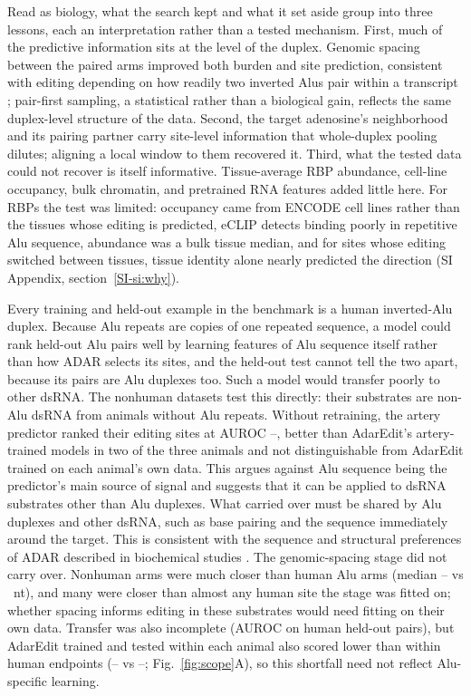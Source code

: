 \documentclass[9pt,twocolumn,twoside]{pnas-new}
\newcommand{\SIref}[1]{\ref*{SI-#1}}
\begin{document}
Read as biology, what the search kept and what it set aside group into three lessons, each an interpretation rather than a tested mechanism. First, much of the predictive information sits at the level of the duplex. Genomic spacing between the paired arms improved both burden and site prediction, consistent with editing depending on how readily two inverted Alus pair within a transcript \cite{Bazak2014Editability}; pair-first sampling, a statistical rather than a biological gain, reflects the same duplex-level structure of the data. Second, the target adenosine's neighborhood and its pairing partner carry site-level information that whole-duplex pooling dilutes; aligning a local window to them recovered it. Third, what the tested data could not recover is itself informative. Tissue-average RBP abundance, cell-line occupancy, bulk chromatin, and pretrained RNA features added little here. For RBPs the test was limited: occupancy came from ENCODE cell lines rather than the tissues whose editing is predicted, eCLIP detects binding poorly in repetitive Alu sequence, abundance was a bulk tissue median, and for sites whose editing switched between tissues, tissue identity alone nearly predicted the direction (SI Appendix, section~\SIref{si:why}).

Every training and held-out example in the benchmark is a human inverted-Alu duplex. Because Alu repeats are copies of one repeated sequence, a model could rank held-out Alu pairs well by learning features of Alu sequence itself rather than how ADAR selects its sites, and the held-out test cannot tell the two apart, because its pairs are Alu duplexes too. Such a model would transfer poorly to other dsRNA. The nonhuman datasets test this directly: their substrates are non-Alu dsRNA from animals without Alu repeats. Without retraining, the artery predictor ranked their editing sites at AUROC \NonhumanArteryAUROCMin{}--\NonhumanArteryAUROCMax{}, better than AdarEdit's artery-trained models in two of the three animals and not distinguishable from AdarEdit trained on each animal's own data. This argues against Alu sequence being the predictor's main source of signal and suggests that it can be applied to dsRNA substrates other than Alu duplexes. What carried over must be shared by Alu duplexes and other dsRNA, such as base pairing and the sequence immediately around the target. This is consistent with the sequence and structural preferences of ADAR described in biochemical studies \cite{Lehmann2000,Eggington2011}. The genomic-spacing stage did not carry over. Nonhuman arms were much closer than human Alu arms (median \NonhumanMedianGapMin{}--\NonhumanMedianGapMax{} vs \NonhumanHumanMedianGap{}~nt), and many were closer than almost any human site the stage was fitted on; whether spacing informs editing in these substrates would need fitting on their own data. Transfer was also incomplete (AUROC \LockedArteryAUROC{} on human held-out pairs), but AdarEdit trained and tested within each animal also scored lower than within human endpoints (\ReferenceNonhumanWithinAUROCMin{}--\ReferenceNonhumanWithinAUROCMax{} vs \ReferenceHumanWithinAUROCMin{}--\ReferenceHumanWithinAUROCMax{}; Fig.~\ref{fig:scope}A), so this shortfall need not reflect Alu-specific learning.
\end{document}
